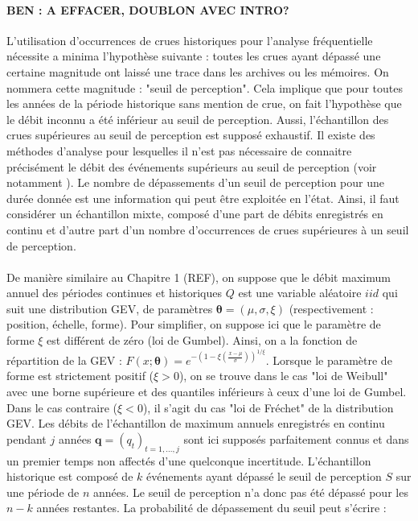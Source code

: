 	\paragraph{BEN : A EFFACER, DOUBLON AVEC INTRO?} 
	
		L'utilisation d'occurrences de crues historiques pour l'analyse fréquentielle nécessite a minima l'hypothèse suivante : toutes les crues ayant dépassé une certaine magnitude ont laissé une trace dans les archives ou les mémoires. On nommera cette magnitude : "seuil de perception". Cela implique que pour toutes les années de la période historique sans mention de crue, on fait l'hypothèse que le débit inconnu a été inférieur au seuil de perception. Aussi, l'échantillon des crues supérieures au seuil de perception est supposé exhaustif. Il existe des méthodes d'analyse pour lesquelles il n'est pas nécessaire de connaitre précisément le débit des événements supérieurs au seuil de perception (voir notamment \citet{stedinger_flood_1986}). Le nombre de dépassements d'un seuil de perception pour une durée donnée est une information qui peut être exploitée en l'état. Ainsi, il faut considérer un échantillon mixte, composé d'une part de débits enregistrés en continu et d'autre part d'un nombre d'occurrences de crues supérieures à un seuil de perception. 
			
		\paragraph{}
		De manière similaire au Chapitre 1 (REF), on suppose que le débit maximum annuel des périodes continues et historiques $Q$ est une variable aléatoire $iid$ qui suit une distribution GEV, de paramètres $\boldsymbol{\theta} = (\mu,\sigma,\xi)$ (respectivement : position, échelle, forme). Pour simplifier, on suppose ici que le paramètre de forme $\xi$ est différent de zéro (loi de Gumbel). Ainsi, on a la fonction de répartition de la GEV : $F(x;\boldsymbol{\theta}) = e^{-(1-\xi(\frac{x - \mu}{\sigma}))^{1/\xi}}$. Lorsque le paramètre de forme est strictement positif ($\xi > 0$), on se trouve dans le cas "loi de Weibull" avec une borne supérieure et des quantiles inférieurs à ceux d'une loi de Gumbel. Dans le cas contraire ($\xi < 0$), il s'agit du cas "loi de Fréchet" de la distribution GEV. Les débits de l'échantillon de maximum annuels enregistrés en continu pendant $j$ années $\boldsymbol{q}= (q_t)_{t=1,...,j}$ sont ici supposés parfaitement connus et dans un premier temps non affectés d'une quelconque incertitude. L'échantillon historique est composé de $k$ événements ayant dépassé le seuil de perception $S$ sur une période de $n$ années. Le seuil de perception n'a donc pas été dépassé pour les $n-k$ années restantes. La probabilité de dépassement du seuil peut s'écrire :
		
